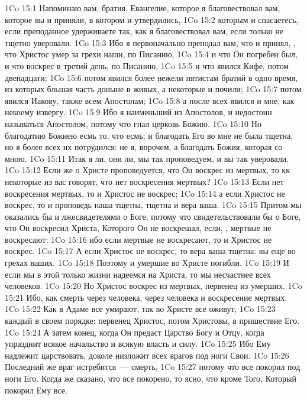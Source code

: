 \vs 1Co 15:1 Напоминаю вам, братия, Евангелие, которое я благовествовал вам, которое вы и приняли, в котором и утвердились,
\vs 1Co 15:2 которым и спасаетесь, если преподанное удерживаете так, как я благовествовал вам, если только не тщетно уверовали.
\vs 1Co 15:3 Ибо я первоначально преподал вам, что и  принял, , что Христос умер за грехи наши, по Писанию,
\vs 1Co 15:4 и что Он погребен был, и что воскрес в третий день, по Писанию,
\vs 1Co 15:5 и что явился Кифе, потом двенадцати;
\vs 1Co 15:6 потом явился более нежели пятистам братий в одно время, из которых бльшая часть доныне в живых, а некоторые и почили;
\vs 1Co 15:7 потом явился Иакову, также всем Апостолам;
\vs 1Co 15:8 а после всех явился и мне, как некоему извергу.
\vs 1Co 15:9 Ибо я наименьший из Апостолов, и недостоин называться Апостолом, потому что гнал церковь Божию.
\vs 1Co 15:10 Но благодатию Божиею есмь то, что есмь; и благодать Его во мне не была тщетна, но я более всех их потрудился: не я, впрочем, а благодать Божия, которая со мною.
\vs 1Co 15:11 Итак я ли, они ли, мы так проповедуем, и вы так уверовали.
\rsbpar\vs 1Co 15:12 Если же о Христе проповедуется, что Он воскрес из мертвых, то кк некоторые из вас говорят, что нет воскресения мертвых?
\vs 1Co 15:13 Если нет воскресения мертвых, то и Христос не воскрес;
\vs 1Co 15:14 а если Христос не воскрес, то и проповедь наша тщетна, тщетна и вера ваша.
\vs 1Co 15:15 Притом мы оказались бы и лжесвидетелями о Боге, потому что свидетельствовали бы о Боге, что Он воскресил Христа, Которого Он не воскрешал, если, , мертвые не воскресают;
\vs 1Co 15:16 ибо если мертвые не воскресают, то и Христос не воскрес.
\vs 1Co 15:17 А если Христос не воскрес, то вера ваша тщетна: вы еще во грехах ваших.
\vs 1Co 15:18 Поэтому и умершие во Христе погибли.
\vs 1Co 15:19 И если мы в этой только жизни надеемся на Христа, то мы несчастнее всех человеков.
\vs 1Co 15:20 Но Христос воскрес из мертвых, первенец из умерших.
\vs 1Co 15:21 Ибо, как смерть через человека,  через человека и воскресение мертвых.
\vs 1Co 15:22 Как в Адаме все умирают, так во Христе все оживут,
\vs 1Co 15:23 каждый в своем порядке: первенец Христос, потом Христовы, в пришествие Его.
\vs 1Co 15:24 А затем конец, когда Он предаст Царство Богу и Отцу, когда упразднит всякое начальство и всякую власть и силу.
\vs 1Co 15:25 Ибо Ему надлежит царствовать, доколе низложит всех врагов под ноги Свои.
\vs 1Co 15:26 Последний же враг истребится~--- смерть,
\vs 1Co 15:27 потому что все покорил под ноги Его. Когда же сказано, что  все покорено, то ясно, что кроме Того, Который покорил Ему все.

